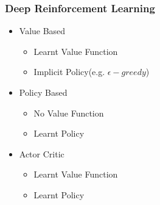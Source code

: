 \begin{frame}[fragile]
  \frametitle{Deep Reinforcement Learning}
  \begin{itemize}
  \item Value Based
    \begin{itemize}
    \item Learnt Value Function
    \item Implicit Policy(e.g. $\epsilon - greedy$)
    \end{itemize}
  \item Policy Based
    \begin{itemize}
    \item No Value Function
    \item Learnt Policy
    \end{itemize}
  \item Actor Critic
    \begin{itemize}
    \item Learnt Value Function
    \item Learnt Policy
    \end{itemize}
  \end{itemize}
\end{frame}